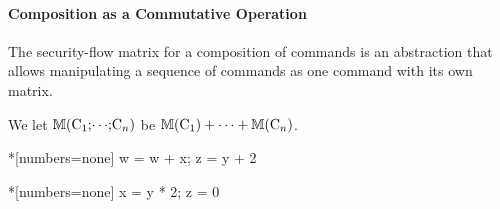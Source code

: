 \paragraph{Composition as a Commutative Operation}

The security-flow matrix for a composition of commands is an abstraction that
allows manipulating a sequence of commands as one command with its own matrix.

\begin{definition}[Composition]
We let $\sfm{\prc|C$_1$;$\cdots$;C$_n$|}$
be $\sfm{\prc|C$_1$|} + \cdots + \sfm{\prc|C$_n$|}$.
\end{definition}

\newsavebox\compone
\begin{lrbox}{\compone}
\begin{minipage}{.25\linewidth}
\begin{whilelisting}*[numbers=none]
w = w + x;
z = y + 2
\end{whilelisting}
\end{minipage}
\end{lrbox}

\newsavebox\comptwo
\begin{lrbox}{\comptwo}
\begin{minipage}{.25\linewidth}
\begin{whilelisting}*[numbers=none]
x = y * 2;
z = 0
\end{whilelisting}
\end{minipage}
\end{lrbox}

